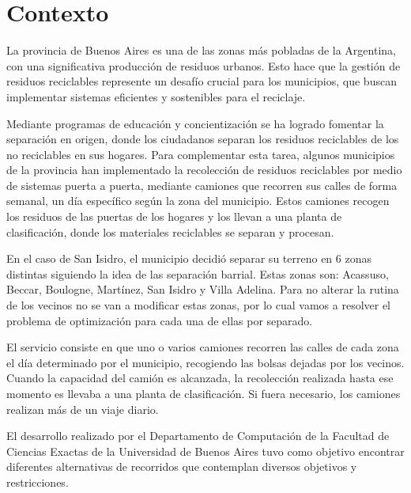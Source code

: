 \section{Contexto}

La provincia de Buenos Aires es una de las zonas más pobladas de la Argentina, con una significativa producción de residuos urbanos. Esto hace que la gestión de residuos reciclables represente un desafío crucial para los municipios, que buscan implementar sistemas eficientes y sostenibles para el reciclaje. 

\vspace{3mm}

Mediante programas de educación y concientización se ha logrado fomentar la separación en origen, donde los ciudadanos separan los residuos reciclables de los no reciclables en sus hogares. Para complementar esta tarea, algunos municipios de la provincia han implementado la recolección de residuos reciclables por medio de sistemas puerta a puerta, mediante camiones que recorren sus calles de forma semanal, un día específico según la zona del municipio. Estos camiones recogen los residuos de las puertas de los hogares y los llevan a una planta de clasificación, donde los materiales reciclables se separan y procesan. 

\vspace{3mm}

En el caso de San Isidro, el municipio decidió separar su terreno en 6 zonas distintas siguiendo la idea de las separación barrial. Estas zonas son: Acassuso, Beccar, Boulogne, Martínez, San Isidro y Villa Adelina. Para no alterar la rutina de los vecinos no se van a modificar estas zonas, por lo cual vamos a resolver el problema de optimización para cada una de ellas por separado.

\vspace{3mm}

El servicio consiste en que uno o varios camiones recorren las calles de cada
zona el día determinado por el municipio, recogiendo las bolsas dejadas por los
vecinos. Cuando la capacidad del camión es alcanzada, la recolección realizada
hasta ese momento es llevaba a una planta de clasificación. Si fuera necesario,
los camiones realizan más de un viaje diario.

\vspace{3mm}

El desarrollo realizado por el Departamento de Computación de la Facultad de
Ciencias Exactas de la Universidad de Buenos Aires tuvo como objetivo encontrar diferentes alternativas de recorridos que contemplan diversos objetivos y restricciones.

